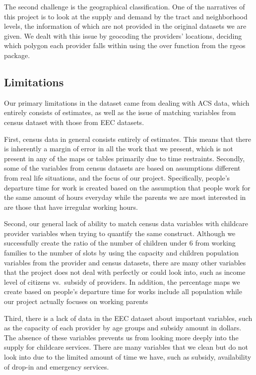 \documentclass[10pt,letterpaper]{article}
\begin{document}
The second challenge is the geographical classification. One of the
narratives of this project is to look at the supply and demand by the
tract and neighborhood levels, the information of which are not provided
in the original datasets we are given. We dealt with this issue by
geocoding the providers' locations, deciding which polygon each provider
falls within using the over function from the rgeos package.

\subsection{Limitations}\label{limitations}

Our primary limitations in the dataset came from dealing with ACS data,
which entirely consists of estimates, as well as the issue of matching
variables from census dataset with those from EEC datasets.

First, census data in general consists entirely of estimates. This means
that there is inherently a margin of error in all the work that we
present, which is not present in any of the maps or tables primarily due
to time restraints. Secondly, some of the variables from census datasets
are based on assumptions different from real life situations, and the
focus of our project. Specifically, people's departure time for work is
created based on the assumption that people work for the same amount of
hours everyday while the parents we are most interested in are those
that have irregular working hours.

Second, our general lack of ability to match census data variables with
childcare provider variables when trying to quantify the same construct.
Although we successfully create the ratio of the number of children
under 6 from working families to the number of slots by using the
capacity and children population variables from the provider and census
datasets, there are many other variables that the project does not deal
with perfectly or could look into, such as income level of citizens
vs.~subsidy of providers. In addition, the percentage maps we create
based on people's departure time for works include all population while
our project actually focuses on working parents

Third, there is a lack of data in the EEC dataset about important
variables, such as the capacity of each provider by age groups and
subsidy amount in dollars. The absence of these variables prevents us
from looking more deeply into the supply for childcare services. There
are many variables that we clean but do not look into due to the limited
amount of time we have, such as subsidy, availability of drop-in and
emergency services.
\end{document}
